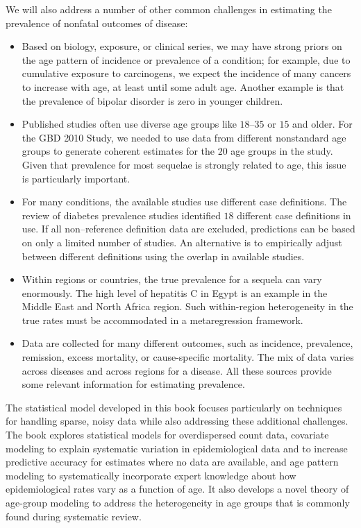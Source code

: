 We will also address a number of other common challenges in estimating the
prevalence of nonfatal outcomes of disease:
\begin{itemize}
\item Based on biology, exposure, or clinical series, we may have strong
priors on the age pattern of incidence or prevalence of a condition;
for example, due to cumulative exposure to carcinogens, we expect the
incidence of many cancers to increase with
age, at least until some
adult age.  Another example is that the prevalence of bipolar
disorder is zero in younger children.

\item Published studies often use diverse age groups like $18$--$35$
or $15$ and older.  For the GBD 2010 Study, we needed to use data from different
nonstandard age groups to generate coherent estimates for the $20$
age groups in the study.  Given that prevalence for most sequelae is
strongly related to age, this issue is particularly important.

\item For many conditions, the available studies use
different case definitions.  The review of diabetes prevalence studies
identified $18$ different case definitions in use.  If all non--reference
definition data are excluded, predictions can be based on only a
limited number of studies.  An alternative is to empirically
adjust between different definitions using the overlap
in available studies.

\item Within regions or
countries, the true prevalence for a sequela can vary enormously. The
high level of hepatitis C in Egypt is an example in the Middle East
and North Africa region.  Such within-region heterogeneity in the true
rates must be accommodated in a metaregression framework.

\item Data are collected for many different outcomes,
such as incidence, prevalence, remission, excess mortality, or
cause-specific mortality.  The mix of data varies across diseases and
across regions for a disease.  All these sources provide some
relevant information for estimating prevalence.
\end{itemize}

The statistical model developed in this book focuses
particularly on techniques for handling sparse, noisy data while also
addressing these additional challenges.  The book explores statistical
models for overdispersed count data, covariate modeling to explain
systematic variation in epidemiological data and to increase predictive
accuracy for estimates where no data are available, and age pattern
modeling to systematically incorporate expert knowledge about how
epidemiological rates vary as a function of age.  It also develops a
novel theory of age-group modeling to address the heterogeneity in
age groups that is commonly found during systematic review.

